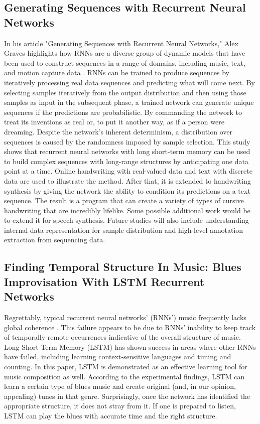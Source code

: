 \documentclass[letterpaper]{article}
\begin{document}
\subsection{Generating Sequences with Recurrent Neural Networks}

In his article "Generating Sequences with Recurrent Neural Networks," Alex Graves highlights how RNNs are a diverse group of dynamic models that have been used to construct sequences in a range of domains, including music, text, and motion capture data \cite{b5}. RNNs can be trained to produce sequences by iteratively processing real data sequences and predicting what will come next. By selecting samples iteratively from the output distribution and then using those samples as input in the subsequent phase, a trained network can generate unique sequences if the predictions are probabilistic. By commanding the network to treat its inventions as real or, to put it another way, as if a person were dreaming. Despite the network's inherent determinism, a distribution over sequences is caused by the randomness imposed by sample selection. This study shows that recurrent neural networks with long short-term memory can be used to build complex sequences with long-range structures by anticipating one data point at a time. Online handwriting with real-valued data and text with discrete data are used to illustrate the method. After that, it is extended to handwriting synthesis by giving the network the ability to condition its predictions on a text sequence. The result is a program that can create a variety of types of cursive handwriting that are incredibly lifelike. Some possible additional work would be to extend it for speech synthesis. Future studies will also include understanding internal data representation for sample distribution and high-level annotation extraction from sequencing data.

\subsection{Finding Temporal Structure In Music: Blues Improvisation With LSTM Recurrent Networks}

Regrettably, typical recurrent neural networks' (RNNs') music frequently lacks global coherence \cite{b6}. This failure appears to be due to RNNs' inability to keep track of temporally remote occurrences indicative of the overall structure of music. Long Short-Term Memory (LSTM) has shown success in areas where other RNNs have failed, including learning context-sensitive languages and timing and counting. In this paper, LSTM is demonstrated as an effective learning tool for music composition as well. According to the experimental findings, LSTM can learn a certain type of blues music and create original (and, in our opinion, appealing) tunes in that genre. Surprisingly, once the network has identified the appropriate structure, it does not stray from it. If one is prepared to listen, LSTM can play the blues with accurate time and the right structure.
\end{document}
